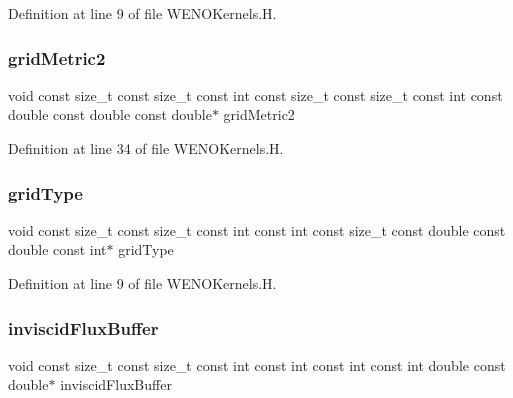 Definition at line 9 of file W\+E\+N\+O\+Kernels.\+H.

\hypertarget{WENOKernels_8H_ad4379232ca7d56ebc603f46f363dca63}{}\label{WENOKernels_8H_ad4379232ca7d56ebc603f46f363dca63} 
\subsubsection{\texorpdfstring{grid\+Metric2}{gridMetric2}}
{\footnotesize\ttfamily void const size\+\_\+t const size\+\_\+t const int const size\+\_\+t const size\+\_\+t const int const double const double const double$\ast$ grid\+Metric2}



Definition at line 34 of file W\+E\+N\+O\+Kernels.\+H.

\hypertarget{WENOKernels_8H_ab35a6cf312bb0fddda7097a149c3e946}{}\label{WENOKernels_8H_ab35a6cf312bb0fddda7097a149c3e946} 
\subsubsection{\texorpdfstring{grid\+Type}{gridType}}
{\footnotesize\ttfamily void const size\+\_\+t const size\+\_\+t const int const int const size\+\_\+t const double const double const int$\ast$ grid\+Type}



Definition at line 9 of file W\+E\+N\+O\+Kernels.\+H.

\hypertarget{WENOKernels_8H_a263d06ceac785fb9ccc396be5508a5d6}{}\label{WENOKernels_8H_a263d06ceac785fb9ccc396be5508a5d6} 
\subsubsection{\texorpdfstring{inviscid\+Flux\+Buffer}{inviscidFluxBuffer}}
{\footnotesize\ttfamily void const size\+\_\+t const size\+\_\+t const int const int const int const int double const double$\ast$ inviscid\+Flux\+Buffer}



